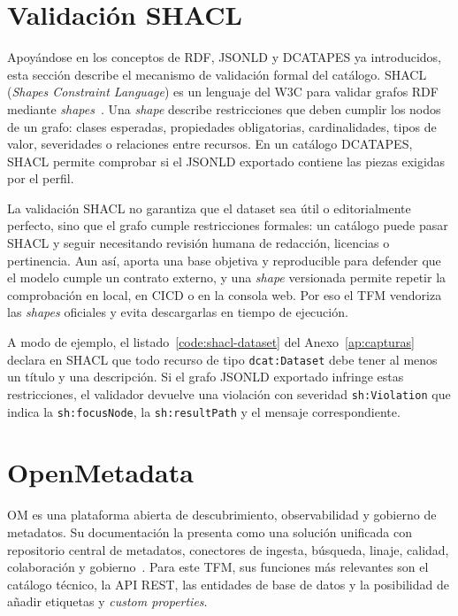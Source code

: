 \section{Validación SHACL}\label{sec:shacl}

Apoyándose en los conceptos de \ac{RDF}, \ac{JSONLD} y \ac{DCATAPES} ya introducidos, esta sección describe el mecanismo de validación formal del catálogo. \ac{SHACL} (\emph{Shapes Constraint Language}) es un lenguaje del \ac{W3C} para validar grafos \ac{RDF} mediante \emph{shapes}~\cite{w3cShacl}. Una \emph{shape} describe restricciones que deben cumplir los nodos de un grafo: clases esperadas, propiedades obligatorias, cardinalidades, tipos de valor, severidades o relaciones entre recursos. En un catálogo \ac{DCATAPES}, \ac{SHACL} permite comprobar si el \ac{JSONLD} exportado contiene las piezas exigidas por el perfil.

La validación \ac{SHACL} no garantiza que el dataset sea útil o editorialmente perfecto, sino que el grafo cumple restricciones formales: un catálogo puede pasar \ac{SHACL} y seguir necesitando revisión humana de redacción, licencias o pertinencia. Aun así, aporta una base objetiva y reproducible para defender que el modelo cumple un contrato externo, y una \emph{shape} versionada permite repetir la comprobación en local, en \ac{CICD} o en la consola web. Por eso el TFM vendoriza las \emph{shapes} oficiales y evita descargarlas en tiempo de ejecución.

A modo de ejemplo, el listado~\ref{code:shacl-dataset} del Anexo~\ref{ap:capturas} declara en \ac{SHACL} que todo recurso de tipo \texttt{dcat:Dataset} debe tener al menos un título y una descripción. Si el grafo \ac{JSONLD} exportado infringe estas restricciones, el validador devuelve una violación con severidad \texttt{sh:Violation} que indica la \texttt{sh:focusNode}, la \texttt{sh:resultPath} y el mensaje correspondiente.

\section{OpenMetadata}\label{sec:openmetadata}

\ac{OM} es una plataforma abierta de descubrimiento, observabilidad y gobierno de metadatos. Su documentación la presenta como una solución unificada con repositorio central de metadatos, conectores de ingesta, búsqueda, linaje, calidad, colaboración y gobierno~\cite{openmetadataDocs}. Para este TFM, sus funciones más relevantes son el catálogo técnico, la \ac{API} \ac{REST}, las entidades de base de datos y la posibilidad de añadir etiquetas y \emph{custom properties}.

